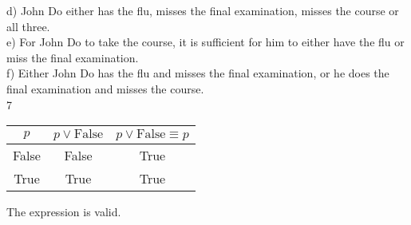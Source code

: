 \documentclass{article}
\begin{document}
d) John Do either has the flu, misses the final examination, misses the course or all three. \\

e) For John Do to take the course, it is sufficient for him to either have the flu or miss the final examination. \\

f) Either John Do has the flu and misses the final examination, or he does the final examination and misses the course. \\

\vspace{10mm}
7
\begin{center}
    \begin{tabular}{c|c||c}
        $p$ & \( p \vee \textrm{False} \) & \( p \vee \textrm{False} \equiv p \) \\
        \hline
        False & False & True \\
        True & True & True \\
    \end{tabular}
    The expression is valid.
\end{center}
\end{document}
